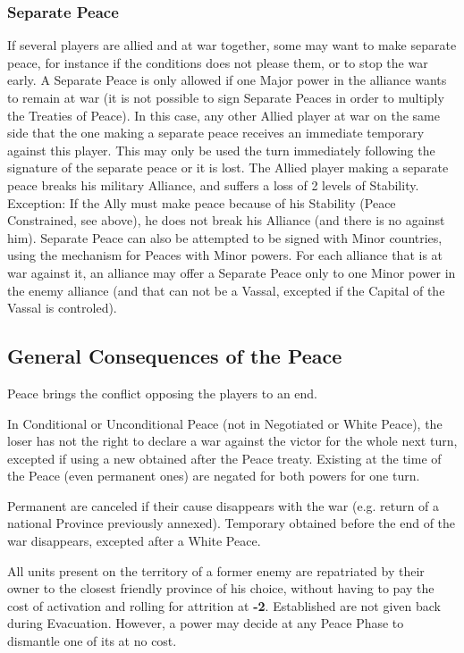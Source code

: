 \subsubsection{Separate Peace}
\aparag If several players are allied and at war together, some may want to
make separate peace, for instance if the conditions does not please them, or
to stop the war early. A Separate Peace is only allowed if one Major power in
the alliance wants to remain at war (it is not possible to sign Separate
Peaces in order to multiply the Treaties of Peace).
In this case, any other Allied player at war on the same side that the one
making a separate peace receives an immediate temporary \CB against this
player.
\bparag This \CB may only be used the turn immediately following the signature
of the separate peace or it is lost.
\bparag The Allied player making a separate peace breaks his military
Alliance, and suffers a loss of 2 levels of Stability.
\bparag Exception: If the Ally must make peace because of his Stability (Peace
Constrained, see above), he does not break his Alliance (and there is no \CB
against him).
\aparag Separate Peace can also be attempted to be signed with Minor
countries, using the mechanism for Peaces with Minor powers. For each alliance
that is at war against it, an alliance may offer a Separate Peace only to one
Minor power in the enemy alliance (and that can not be a Vassal, excepted if
the Capital of the Vassal is controled).



\subsection{General Consequences of the Peace}

\aparag Peace brings the conflict opposing the players to an end.

\aparag In Conditional or Unconditional Peace (not in Negotiated or White
Peace), the loser has not the right to declare a war against the victor for
the whole next turn, excepted if using a new \CB obtained after the Peace
treaty.  Existing \CB at the time of the Peace (even permanent ones) are
negated for both powers for one turn.

Permanent \CB are canceled if their cause disappears with the war (e.g.
return of a national Province previously annexed). Temporary \CB obtained
before the end of the war disappears, excepted after a White Peace.

All units present on the territory of a former enemy are repatriated by their
owner to the closest friendly province of his choice, without having to pay
the cost of activation and rolling for attrition at {\bf -2}.
\bparag Established \Presidios are not given back during Evacuation.
\bparag However, a power may decide at any Peace Phase to dismantle one of its
\Presidios at no cost.


